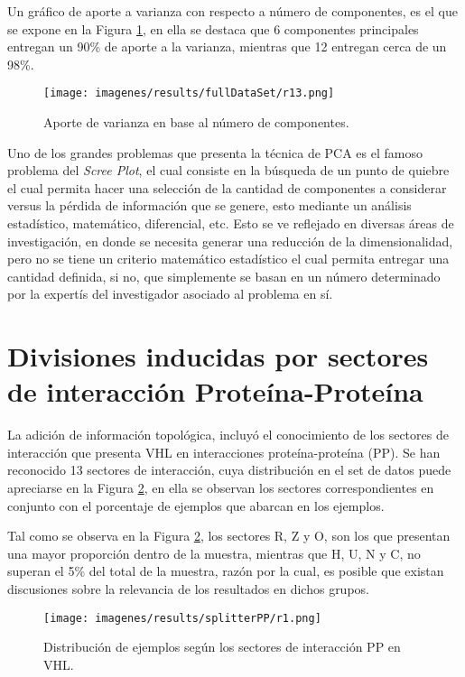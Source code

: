 Un gr\'afico de aporte a varianza con respecto a n\'umero de componentes, es el que se expone en la Figura \ref{car2}, en ella se destaca que 6 componentes principales entregan un 90\% de aporte a la varianza, mientras que 12 entregan cerca de un 98\%.

\begin{figure}[!h]
	
	\centering
	\texttt{[image: imagenes/results/fullDataSet/r13.png]}
	\caption{Aporte de varianza en base al n\'umero de componentes.}
	\label{car2}
\end{figure}

Uno de los grandes problemas que presenta la t\'ecnica de PCA es el famoso problema del \textit{Scree Plot}, el cual consiste en la b\'usqueda de un punto de quiebre el cual permita hacer una selecci\'on de la cantidad de componentes a considerar versus la p\'erdida de informaci\'on que se genere, esto mediante un an\'alisis estad\'istico, matem\'atico, diferencial, etc. Esto se ve reflejado en diversas \'areas de investigaci\'on, en donde se necesita generar una reducci\'on de la dimensionalidad, pero no se tiene un criterio matem\'atico estad\'istico el cual permita entregar una cantidad definida, si no, que simplemente se basan en un n\'umero determinado por la expert\'is del investigador asociado al problema en s\'i.

\section{Divisiones inducidas por sectores de interacci\'on Prote\'ina-Prote\'ina}

La adici\'on de informaci\'on topol\'ogica, incluy\'o el conocimiento de los sectores de interacci\'on que presenta VHL en interacciones prote\'ina-prote\'ina (PP). Se han reconocido 13 sectores de interacci\'on, cuya distribuci\'on en el set de datos puede apreciarse en la Figura \ref{splitterPP1}, en ella se observan los sectores correspondientes en conjunto con el porcentaje de ejemplos que abarcan en los ejemplos. 

Tal como se observa en la Figura \ref{splitterPP1}, los sectores R, Z y O, son los que presentan una mayor proporci\'on dentro de la muestra, mientras que H, U, N y C, no superan el 5\% del total de la muestra, raz\'on por la cual, es posible que existan discusiones sobre la relevancia de los resultados en dichos grupos.

\begin{figure}[!h]
	\centering
	\texttt{[image: imagenes/results/splitterPP/r1.png]}
	\caption{Distribuci\'on de ejemplos seg\'un los sectores de interacci\'on PP en VHL.}
	\label{splitterPP1}
\end{figure}

